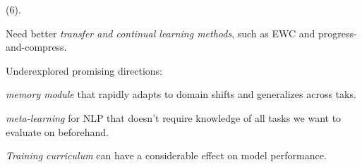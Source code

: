 \documentclass[11pt]{article}
\begin{document}
 (6). 
\begin{compactitem}
	\item Need better \textit{transfer and continual learning methods}, such as EWC and progress-and-compress. 
	
	\item Underexplored promising directions:
	\begin{compactitem}
		\item  \textit{memory module} that rapidly adapts to domain shifts and generalizes across taks.
		\item \textit{meta-learning} for NLP that doesn't require knowledge of all tasks we want to evaluate on beforehand.
	\end{compactitem}

	\item \textit{Training curriculum} can have a considerable effect on model performance. 
\end{compactitem}






\end{document}
